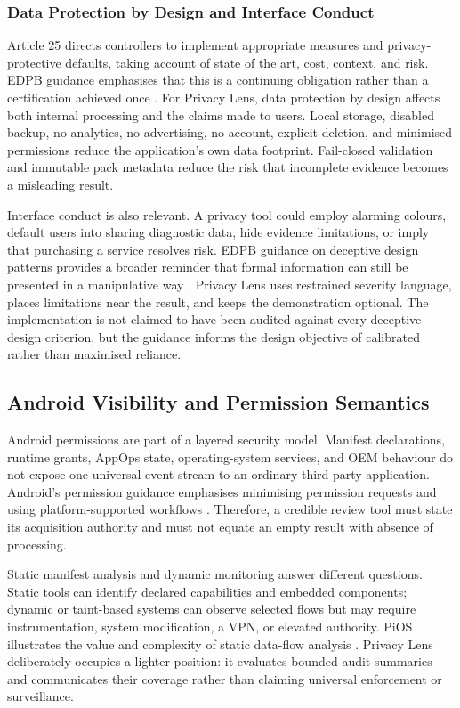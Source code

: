 \subsubsection{Data Protection by Design and Interface Conduct}

Article 25 directs controllers to implement appropriate measures and privacy-protective defaults, taking account of state of the art, cost, context, and risk. EDPB guidance emphasises that this is a continuing obligation rather than a certification achieved once \cite{edpb2019}. For Privacy Lens, data protection by design affects both internal processing and the claims made to users. Local storage, disabled backup, no analytics, no advertising, no account, explicit deletion, and minimised permissions reduce the application's own data footprint. Fail-closed validation and immutable pack metadata reduce the risk that incomplete evidence becomes a misleading result.

Interface conduct is also relevant. A privacy tool could employ alarming colours, default users into sharing diagnostic data, hide evidence limitations, or imply that purchasing a service resolves risk. EDPB guidance on deceptive design patterns provides a broader reminder that formal information can still be presented in a manipulative way \cite{edpb2022}. Privacy Lens uses restrained severity language, places limitations near the result, and keeps the demonstration optional. The implementation is not claimed to have been audited against every deceptive-design criterion, but the guidance informs the design objective of calibrated rather than maximised reliance.

\subsection{Android Visibility and Permission Semantics}

Android permissions are part of a layered security model. Manifest declarations, runtime grants, AppOps state, operating-system services, and OEM behaviour do not expose one universal event stream to an ordinary third-party application. Android's permission guidance emphasises minimising permission requests and using platform-supported workflows \cite{androidpermissions2026}. Therefore, a credible review tool must state its acquisition authority and must not equate an empty result with absence of processing.

Static manifest analysis and dynamic monitoring answer different questions. Static tools can identify declared capabilities and embedded components; dynamic or taint-based systems can observe selected flows but may require instrumentation, system modification, a VPN, or elevated authority. PiOS illustrates the value and complexity of static data-flow analysis \cite{49}. Privacy Lens deliberately occupies a lighter position: it evaluates bounded audit summaries and communicates their coverage rather than claiming universal enforcement or surveillance.


